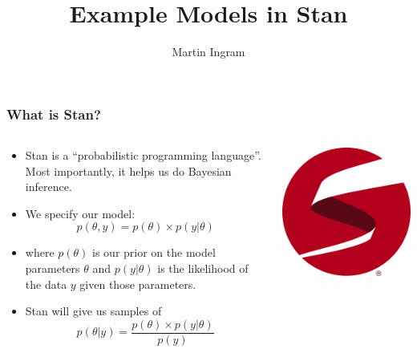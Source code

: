 \documentclass{beamer}
\title{Example Models in Stan}
\author{Martin Ingram}
\begin{document}
\begin{frame}
\titlepage
\end{frame}

\begin{frame}
\frametitle{What is Stan?}
\begin{columns}
\begin{column}{0.75\textwidth}
\begin{itemize}
	\item Stan is a ``probabilistic programming language''. Most importantly, it helps us do Bayesian inference.
	\item We specify our model:
	\begin{equation}
		p(\theta, y) = p(\theta) \times p(y | \theta)
	\end{equation}
	\item where $p(\theta)$ is our prior on the model parameters $\theta$ and $p(y | \theta)$ is the likelihood of the data $y$ given those parameters.
	\item Stan will give us samples of
	\begin{equation}
		p(\theta | y) = \frac{p(\theta) \times p(y | \theta)}{p(y)}
	\end{equation}
\end{itemize}
\end{column}
\begin{column}{0.25\textwidth}
\includegraphics[width=\textwidth]{stan_logo}
\end{column}
\end{columns}
\end{frame}
\end{document}
